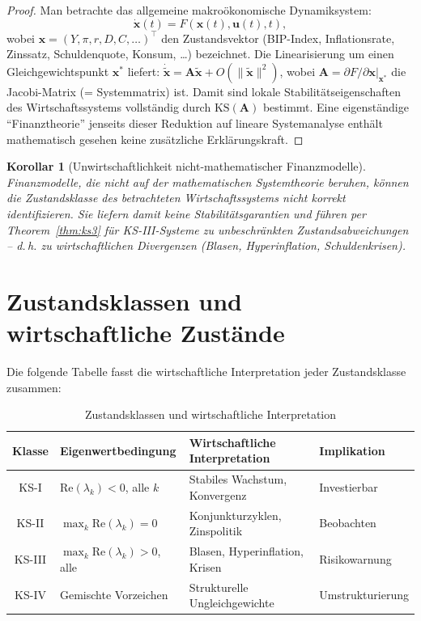 ﻿\documentclass[12pt, a4paper, titlepage]{report}
\newtheorem{corollary}[theorem]{Korollar}
\theoremstyle{definition}
\theoremstyle{remark}
\newcommand{\vx}{\bm{x}}
\newcommand{\vu}{\bm{u}}
\newcommand{\vA}{\bm{A}}
\newcommand{\T}{\top}
\newcommand{\re}{\mathrm{Re}}
\newcommand{\KS}{\mathrm{KS}}
\begin{document}
\begin{proof}
Man betrachte das allgemeine makroökonomische Dynamiksystem:
\begin{equation}
  \dot{\vx}(t) = F(\vx(t), \vu(t), t),
  \label{eq:makrodynamik}
\end{equation}
wobei $\vx = (Y, \pi, r, D, C, \ldots)^\T$ den Zustandsvektor (BIP-Index,
Inflationsrate, Zinssatz, Schuldenquote, Konsum, \ldots) bezeichnet. Die
Linearisierung um einen Gleichgewichtspunkt $\vx^*$ liefert:
$\dot{\tilde{\vx}} = \vA\tilde{\vx} + O(\|\tilde{\vx}\|^2)$, wobei
$\vA = \partial F / \partial \vx\big|_{\vx^*}$ die Jacobi-Matrix (= Systemmatrix)
ist. Damit sind lokale Stabilitätseigenschaften des Wirtschaftssystems vollständig
durch $\KS(\vA)$ bestimmt. Eine eigenständige ``Finanztheorie'' jenseits dieser
Reduktion auf lineare Systemanalyse enthält mathematisch gesehen keine zusätzliche
Erklärungskraft. \qedhere
\end{proof}

\begin{corollary}[Unwirtschaftlichkeit nicht-mathematischer Finanzmodelle]
\label{cor:unwirtschaft}
Finanzmodelle, die nicht auf der mathematischen Systemtheorie beruhen, können die
Zustandsklasse des betrachteten Wirtschaftssystems nicht korrekt identifizieren.
Sie liefern damit keine Stabilitätsgarantien und führen per Theorem~\ref{thm:ks3}
für KS-III-Systeme zu unbeschränkten Zustandsabweichungen -- d.\,h. zu
wirtschaftlichen Divergenzen (Blasen, Hyperinflation, Schuldenkrisen).
\end{corollary}

\section{Zustandsklassen und wirtschaftliche Zustände}

Die folgende Tabelle fasst die wirtschaftliche Interpretation jeder Zustandsklasse
zusammen:

\begin{table}[H]
\centering
\caption{Zustandsklassen und wirtschaftliche Interpretation}
\label{tab:klassen_wirtschaft}
\begin{tabular}{clll}
\toprule
Klasse & Eigenwertbedingung & Wirtschaftliche Interpretation & Implikation \\
\midrule
KS-I   & $\re(\lambda_k) < 0$, alle $k$
        & Stabiles Wachstum, Konvergenz & Investierbar \\
KS-II  & $\max_k\re(\lambda_k) = 0$
        & Konjunkturzyklen, Zinspolitik & Beobachten \\
KS-III & $\max_k\re(\lambda_k) > 0$, alle
        & Blasen, Hyperinflation, Krisen & Risikowarnung \\
KS-IV  & Gemischte Vorzeichen
        & Strukturelle Ungleichgewichte & Umstrukturierung \\
\bottomrule
\end{tabular}
\end{table}
\end{document}

